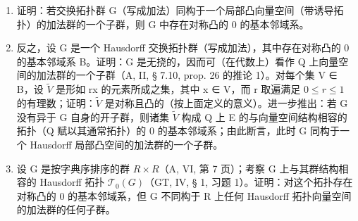 \begin{enumerate}
\def\labelenumi{\alph{enumi})}
\item
  证明：若交换拓扑群 G（写成加法）同构于一个局部凸向量空间（带诱导拓扑）的加法群的一个子群，则 G 中存在对称凸的 0 的基本邻域系。
\item
  反之，设 G 是一个 Hausdorff 交换拓扑群（写成加法），其中存在对称凸的 0 的基本邻域系 B。证明：G 是无挠的，因而可（在代数上）看作 Q 上向量空间的加法群的一个子群（A, II, § 7.10, prop. 26 的推论 1）。对每个集 V ∈ B，设 \(\tilde{V}\) 是形如 rx 的元素所成之集，其中 x ∈ V，而 r 取遍满足 \(0 \leqslant r \leqslant 1\) 的有理数；证明：\(\tilde{V}\) 是对称且凸的（按上面定义的意义）。进一步推出：若 G 没有异于 G 自身的开子群，则诸集 \(\tilde{V}\) 构成 Q 上 E 的与向量空间结构相容的拓扑（Q 赋以其通常拓扑）的 0 的基本邻域系；由此断言，此时 G 同构于一个 Hausdorff 局部凸空间的加法群的一个子群。
\item
  设 G 是按字典序排序的群 \(R \times R\)（A, VI, 第 7 页）；考察 G 上与其群结构相容的 Hausdorff 拓扑 \(\mathcal{T}_{0}(G)\)（GT, IV, § 1, 习题 1）。证明：对这个拓扑存在对称凸的 0 的基本邻域系，但 G 不同构于 R 上任何 Hausdorff 拓扑向量空间的加法群的任何子群。
\end{enumerate}

